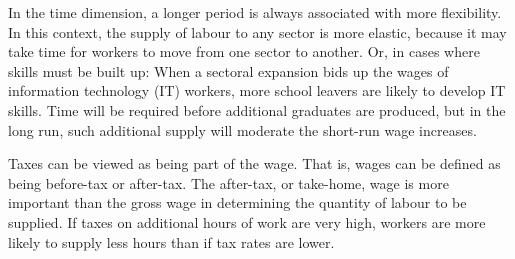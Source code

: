 In the time dimension, a longer period is always associated with more
flexibility. In this context, the supply of labour to any sector is more
elastic, because it may take time for workers to move from one sector to
another. Or, in cases where skills must be built up: When a sectoral
expansion bids up the wages of information technology (IT) workers, more
school leavers are likely to develop IT skills. Time will be required before
additional graduates are produced, but in the long run, such additional
supply will moderate the short-run wage increases.

Taxes can be viewed as being part of the wage. That is, wages can be defined
as being before-tax or after-tax. The after-tax, or take-home, wage is more 
important than the gross wage in determining the quantity of labour to be 
supplied. If taxes on additional hours of work are very high, workers are 
more likely to supply less hours than if tax rates are lower.
